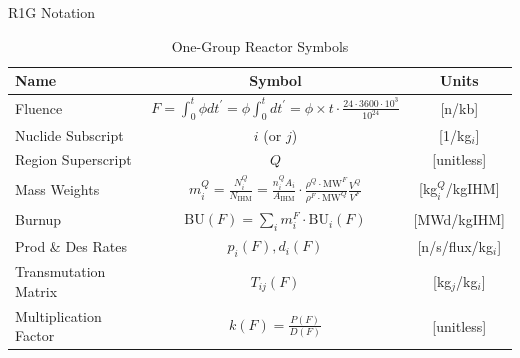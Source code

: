 \documentclass[pdf, autumn, slideColor, nocolorBG]{prosper}
\newcommand{\subscript}[1]{\ensuremath{_{\textrm{#1}}}}
\begin{document}
\begin{slide}{R1G Notation}
\vspace{0.75cm}
\begin{center}
\begin{table}
\caption{One-Group Reactor Symbols}
\tiny
\begin{tabular}{|l|c|c|}
\hline
\textbf{Name} & \textbf{Symbol} & \textbf{Units} \\
\hline
Fluence & $F = \int_0^t \phi dt^\prime = \phi \int_0^t dt^\prime = \phi \times t \cdot \frac{24 \cdot 3600 \cdot 10^3}{10^{24}}$ & [n/kb] \\
Nuclide Subscript & $i$ (or $j$) & [1/kg\subscript{$i$}] \\
Region Superscript & $Q$ & [unitless] \\
Mass Weights & $m_i^Q = \frac{N_i^Q}{N_{\mbox{IHM}}} = \frac{n_i^Q A_i}{A_{\mbox{IHM}}} \cdot \frac{\rho^Q\cdot\mbox{MW}^F}{\rho^F\cdot\mbox{MW}^Q} \frac{V^Q}{V^F}$ & [kg$_i^Q$/kgIHM] \\
Burnup & $\mbox{BU}(F) = \sum_i m_i^F \cdot \mbox{BU}_i(F)$ & [MWd/kgIHM] \\
Prod \& Des Rates & $p_i(F), d_i(F)$ & [n/s/flux/kg$_i$]\\ 
Transmutation Matrix & $T_{ij}(F)$ & [kg$_j$/kg$_i$] \\
Multiplication Factor & $k(F) = \frac{P(F)}{D(F)}$ & [unitless] \\
\hline
\end{tabular}
\end{table}
\end{center}
\end{slide}
\end{document}
